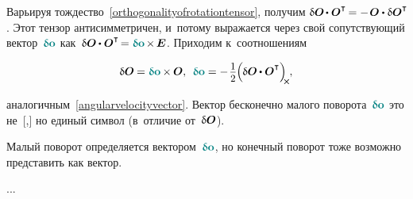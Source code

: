 Варьируя тождество~\eqref{orthogonalityofrotationtensor}, получим ${\variation{\rotationtensor} \hspace{-0.2ex} \dotp \rotationtensor^{\T} \hspace{-0.2ex} = - \hspace{.2ex} \rotationtensor \dotp \variation{\rotationtensor}^{\T}\!}$.
Этот тензор антисимметричен, и~потому выражается через свой сопутствующий вектор~${\varvector{o}}$ как~${\variation{\rotationtensor} \hspace{-0.1ex} \dotp \rotationtensor^{\T} \hspace{-0.3ex} = \varvector{o} \hspace{-0.2ex} \times \hspace{-0.2ex} \UnitDyad}$.
Приходим к~соотношениям

\nopagebreak\vspace{-0.5em}\begin{equation}
\variation{\rotationtensor} \hspace{-0.1ex} = \varvector{o} \hspace{-0.1ex} \times \hspace{-0.1ex} \rotationtensor , \:\:
\varvector{o} = - \hspace{.2ex} \scalebox{.93}{$ \displaystyle\onehalf $} \hspace{-0.1ex} \Bigl( \hspace{-0.1ex} \variation{\rotationtensor} \hspace{-0.1ex} \dotp \rotationtensor^{\T} \Bigr)_{\hspace{-0.25em}\Xcompanion}
\hspace{-0.1ex} ,
\end{equation}

\vspace{-0.5em}\noindent
аналогичным~\eqref{angularvelocityvector}.
Вектор бесконечно малого поворота~${\varvector{o}}$ это не~[,] но единый символ (в~отличие от~${\updelta\hspace{-0.1ex}\bm{O}}$).

Малый поворот определяется вектором~${\varvector{o}}$, но конечный поворот тоже возможно представить как вектор.

...















